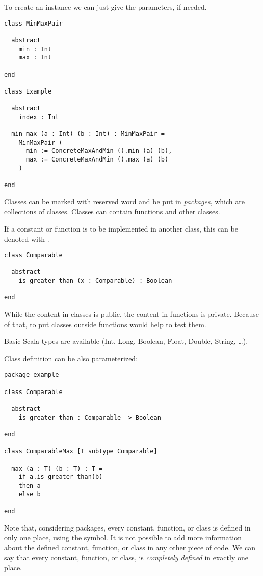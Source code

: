 To create an instance we can just give the parameters, if needed.

\begin{lstlisting}[label={lst:exampleClassMaxAnInstance}]
class MinMaxPair

  abstract
    min : Int
    max : Int

end

class Example

  abstract
    index : Int

  min_max (a : Int) (b : Int) : MinMaxPair =
    MinMaxPair (
      min := ConcreteMaxAndMin ().min (a) (b),
      max := ConcreteMaxAndMin ().max (a) (b)
    )

end
\end{lstlisting}

Classes can be marked with \sodapackage reserved word and be put in \emph{packages}, which are collections of classes.
Classes can contain functions and other classes.

If a constant or function is to be implemented in another class, this can be denoted with \sodaabstract.

\begin{lstlisting}[label={lst:exampleAbstractFunction}]
class Comparable

  abstract
    is_greater_than (x : Comparable) : Boolean

end
\end{lstlisting}

While the content in classes is public, the content in functions is private.
Because of that, to put classes outside functions would help to test them.

Basic Scala types are available (Int, Long, Boolean, Float, Double, String, \ldots).

Class definition can be also parameterized:
\begin{lstlisting}[label={lst:exampleParameterizedClass}]
package example

class Comparable

  abstract
    is_greater_than : Comparable -> Boolean

end

class ComparableMax [T subtype Comparable]

  max (a : T) (b : T) : T =
    if a.is_greater_than(b)
    then a
    else b

end
\end{lstlisting}

Note that, considering packages, every constant, function, or class is defined in only one place, using the \sodadef symbol.
It is not possible to add more information about the defined constant, function, or class in any other piece of code.
We can say that every constant, function, or class, is \emph{completely defined} in exactly one place.

